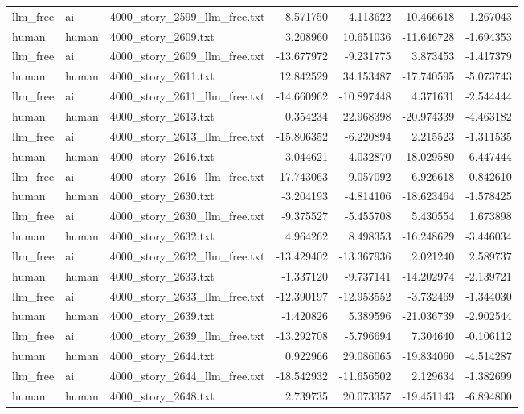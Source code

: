 \begin{longtable}{lllrrrr}
llm\_free & ai & 4000\_story\_2599\_llm\_free.txt & -8.571750 & -4.113622 & 10.466618 & 1.267043 \\
human & human & 4000\_story\_2609.txt & 3.208960 & 10.651036 & -11.646728 & -1.694353 \\
llm\_free & ai & 4000\_story\_2609\_llm\_free.txt & -13.677972 & -9.231775 & 3.873453 & -1.417379 \\
human & human & 4000\_story\_2611.txt & 12.842529 & 34.153487 & -17.740595 & -5.073743 \\
llm\_free & ai & 4000\_story\_2611\_llm\_free.txt & -14.660962 & -10.897448 & 4.371631 & -2.544444 \\
human & human & 4000\_story\_2613.txt & 0.354234 & 22.968398 & -20.974339 & -4.463182 \\
llm\_free & ai & 4000\_story\_2613\_llm\_free.txt & -15.806352 & -6.220894 & 2.215523 & -1.311535 \\
human & human & 4000\_story\_2616.txt & 3.044621 & 4.032870 & -18.029580 & -6.447444 \\
llm\_free & ai & 4000\_story\_2616\_llm\_free.txt & -17.743063 & -9.057092 & 6.926618 & -0.842610 \\
human & human & 4000\_story\_2630.txt & -3.204193 & -4.814106 & -18.623464 & -1.578425 \\
llm\_free & ai & 4000\_story\_2630\_llm\_free.txt & -9.375527 & -5.455708 & 5.430554 & 1.673898 \\
human & human & 4000\_story\_2632.txt & 4.964262 & 8.498353 & -16.248629 & -3.446034 \\
llm\_free & ai & 4000\_story\_2632\_llm\_free.txt & -13.429402 & -13.367936 & 2.021240 & 2.589737 \\
human & human & 4000\_story\_2633.txt & -1.337120 & -9.737141 & -14.202974 & -2.139721 \\
llm\_free & ai & 4000\_story\_2633\_llm\_free.txt & -12.390197 & -12.953552 & -3.732469 & -1.344030 \\
human & human & 4000\_story\_2639.txt & -1.420826 & 5.389596 & -21.036739 & -2.902544 \\
llm\_free & ai & 4000\_story\_2639\_llm\_free.txt & -13.292708 & -5.796694 & 7.304640 & -0.106112 \\
human & human & 4000\_story\_2644.txt & 0.922966 & 29.086065 & -19.834060 & -4.514287 \\
llm\_free & ai & 4000\_story\_2644\_llm\_free.txt & -18.542932 & -11.656502 & 2.129634 & -1.382699 \\
human & human & 4000\_story\_2648.txt & 2.739735 & 20.073357 & -19.451143 & -6.894800 \\

\end{longtable}

